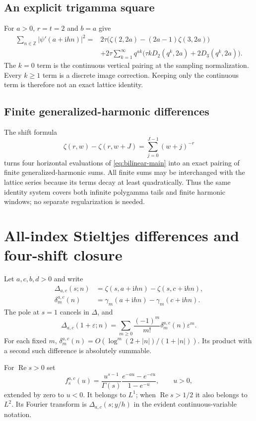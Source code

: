\documentclass[11pt,a4paper]{article}
\numberwithin{equation}{section}
\theoremstyle{definition}
\theoremstyle{remark}
\DeclareMathOperator{\Ree}{Re}
\newcommand{\ii}{\mathrm i}
\newcommand{\Z}{\mathbb Z}
\newcommand{\eps}{\varepsilon}
\begin{document}
\subsection{An explicit trigamma square}
For $a>0$, $r=t=2$ and $b=a$ give
\begin{equation}\label{eq:trigamma-square}
 \begin{split}
 \sum_{n\in\Z}|\psi'(a+\ii hn)|^2
 ={}&2\tau\bigl(\zeta(2,2a)-(2a-1)\zeta(3,2a)\bigr)\\
 &+2\tau\sum_{k=1}^\infty q^{ak}
       \bigl(\tau kD_2(q^k,2a)+2D_3(q^k,2a)\bigr).
 \end{split}
\end{equation}
The $k=0$ term is the continuous vertical pairing at the sampling
normalization. Every $k\ge1$ term is a discrete image correction.
Keeping only the continuous term is therefore not an exact lattice
identity.

\subsection{Finite generalized-harmonic differences}
The shift formula
\[
 \zeta(r,w)-\zeta(r,w+J)=\sum_{j=0}^{J-1}(w+j)^{-r}
\]
turns four horizontal evaluations of \eqref{eq:bilinear-main} into
an exact pairing of finite generalized-harmonic sums. All finite sums
may be interchanged with the lattice series because its terms decay
at least quadratically. Thus the same identity system covers both
infinite polygamma tails and finite harmonic windows; no separate
regularization is needed.

\section{All-index Stieltjes differences and four-shift closure}
\label{sec:differences}

Let $a,c,b,d>0$ and write
\begin{align}
 \Delta_{a,c}(s;n)&=\zeta(s,a+\ii hn)-\zeta(s,c+\ii hn),
 \label{eq:Delta}\\
 \delta_m^{a,c}(n)&=\gamma_m(a+\ii hn)-\gamma_m(c+\ii hn).
 \label{eq:delta}
\end{align}
The pole at $s=1$ cancels in $\Delta$, and
\[
 \Delta_{a,c}(1+\eps;n)
    =\sum_{m\ge0}\frac{(-1)^m}{m!}\delta_m^{a,c}(n)\eps^m.
\]
For each fixed $m$, $\delta_m^{a,c}(n)=O(\log^m(2+|n|)/(1+|n|))$.
Its product with a second such difference is absolutely summable.

For $\Ree s>0$ set
\begin{equation}\label{eq:diff-density}
 f_s^{a,c}(u)=\frac{u^{s-1}}{\Gamma(s)}
                 \frac{e^{-au}-e^{-cu}}{1-e^{-u}},\qquad u>0,
\end{equation}
extended by zero to $u<0$. It belongs to $L^1$; when $\Ree s>1/2$
it also belongs to $L^2$. Its Fourier transform is
$\Delta_{a,c}(s;y/h)$ in the evident continuous-variable notation.
\end{document}

